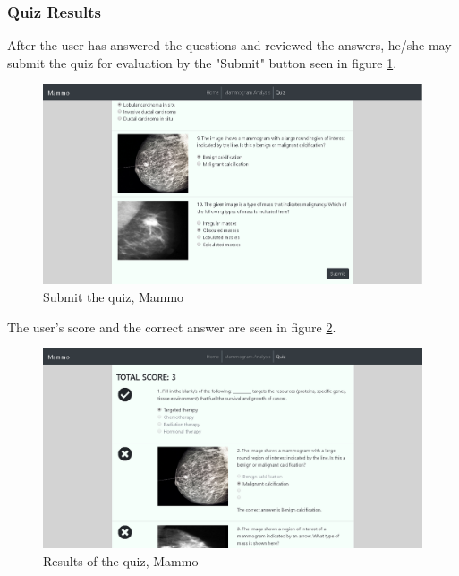 \documentclass[11pt,a4paper,titlepage]{article}
\newcommand{\+}{\discretionary{\mbox{${\bm\cdot}\mkern-1mu$}}{}{}}
\begin{document}
	\subsubsection{Quiz Results}
	\qquad After the user has answered the questions and reviewed the answers, he/she may submit the quiz for evaluation by the "Submit" button seen in figure \ref{fig:submitQuiz}.
	
	\begin{figure}[h]
		\centering
	  	\includegraphics[scale=0.5]{images/submitQuiz.png}
		 \caption{Submit the quiz, Mammo}
	  	\label{fig:submitQuiz}
	\end{figure}
	
		The user's score and the correct answer are seen in figure \ref{fig:quizResults}.
	
	\begin{figure}[h]
		\centering
	  	\includegraphics[scale=0.5]{images/quizResults.png}
		 \caption{Results of the quiz, Mammo}
	  	\label{fig:quizResults}
	\end{figure}
\end{document}
